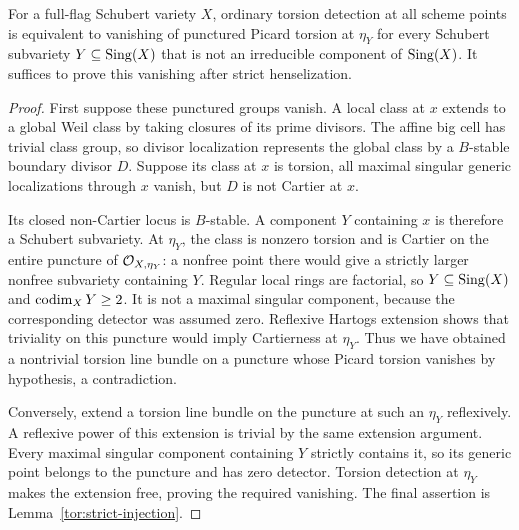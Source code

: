 \begin{proposition}\label{tor:ordinary}
For a full-flag Schubert variety $X$, ordinary torsion detection at all scheme points is equivalent to vanishing of punctured Picard torsion at $\eta_Y$ for every Schubert subvariety $Y\subseteq\operatorname{Sing}(X)$ that is not an irreducible component of $\operatorname{Sing}(X)$. It suffices to prove this vanishing after strict henselization.
\end{proposition}
\begin{proof}
First suppose these punctured groups vanish. A local class at $x$ extends to a global Weil class by taking closures of its prime divisors. The affine big cell has trivial class group, so divisor localization represents the global class by a $B$-stable boundary divisor $D$. Suppose its class at $x$ is torsion, all maximal singular generic localizations through $x$ vanish, but $D$ is not Cartier at $x$.

Its closed non-Cartier locus is $B$-stable. A component $Y$ containing $x$ is therefore a Schubert subvariety. At $\eta_Y$, the class is nonzero torsion and is Cartier on the entire puncture of $\mathcal O_{X,\eta_Y}$: a nonfree point there would give a strictly larger nonfree subvariety containing $Y$. Regular local rings are factorial, so $Y\subseteq\operatorname{Sing}(X)$ and $\operatorname{codim}_XY\ge2$. It is not a maximal singular component, because the corresponding detector was assumed zero. Reflexive Hartogs extension shows that triviality on this puncture would imply Cartierness at $\eta_Y$. Thus we have obtained a nontrivial torsion line bundle on a puncture whose Picard torsion vanishes by hypothesis, a contradiction.

Conversely, extend a torsion line bundle on the puncture at such an $\eta_Y$ reflexively. A reflexive power of this extension is trivial by the same extension argument. Every maximal singular component containing $Y$ strictly contains it, so its generic point belongs to the puncture and has zero detector. Torsion detection at $\eta_Y$ makes the extension free, proving the required vanishing. The final assertion is Lemma~\ref{tor:strict-injection}.
\end{proof}

